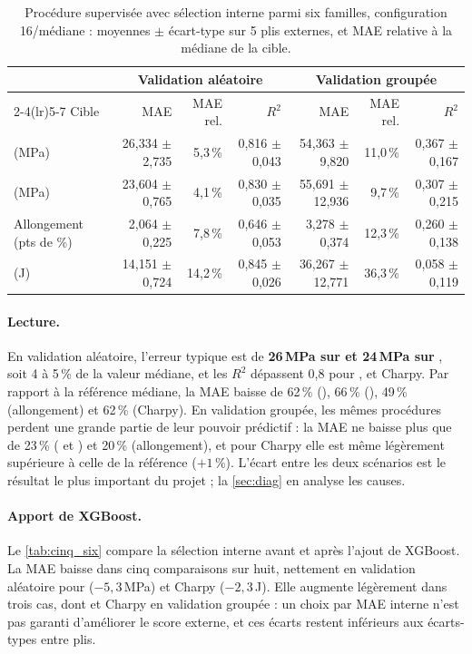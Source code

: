 \begin{table}[htbp]
\centering
\small
\caption{Procédure supervisée avec sélection interne parmi six familles,
configuration 16/médiane : moyennes $\pm$ écart-type sur 5 plis externes, et MAE
relative à la médiane de la cible.}
\label{tab:synthese}
\footnotesize
\setlength{\tabcolsep}{4pt}
\begin{tabular}{@{}l rrr rrr@{}}
\toprule
 & \multicolumn{3}{c}{Validation aléatoire} & \multicolumn{3}{c}{Validation groupée} \\
\cmidrule(lr){2-4}\cmidrule(lr){5-7}
Cible & MAE & MAE rel. & $R^2$ & MAE & MAE rel. & $R^2$ \\
\midrule
\YS{} (MPa)               & 26,334 $\pm$ 2,735 & 5,3\,\%  & 0,816 $\pm$ 0,043 & 54,363 $\pm$ 9,820  & 11,0\,\% & 0,367 $\pm$ 0,167 \\
\UTS{} (MPa)              & 23,604 $\pm$ 0,765 & 4,1\,\%  & 0,830 $\pm$ 0,035 & 55,691 $\pm$ 12,936 & 9,7\,\%  & 0,307 $\pm$ 0,215 \\
Allongement (pts de \%)   & 2,064 $\pm$ 0,225  & 7,8\,\%  & 0,646 $\pm$ 0,053 & 3,278 $\pm$ 0,374   & 12,3\,\% & 0,260 $\pm$ 0,138 \\
\charpy{} (J)             & 14,151 $\pm$ 0,724 & 14,2\,\% & 0,845 $\pm$ 0,026 & 36,267 $\pm$ 12,771 & 36,3\,\% & 0,058 $\pm$ 0,119 \\
\bottomrule
\end{tabular}
\end{table}

\paragraph{Lecture.} En validation aléatoire, l'erreur typique est de
\textbf{26\,MPa sur \YS{} et 24\,MPa sur \UTS}, soit 4 à 5\,\% de la valeur
médiane, et les $R^2$ dépassent 0,8 pour \YS, \UTS{} et Charpy. Par rapport à la
référence médiane, la MAE baisse de 62\,\% (\YS), 66\,\% (\UTS), 49\,\%
(allongement) et 62\,\% (Charpy). En validation groupée, les mêmes procédures
perdent une grande partie de leur pouvoir prédictif : la MAE ne baisse plus que
de 23\,\% (\YS{} et \UTS) et 20\,\% (allongement), et pour Charpy elle est même
légèrement supérieure à celle de la référence ($+1$\,\%). L'écart entre les deux
scénarios est le résultat le plus important du projet ; la \cref{sec:diag} en
analyse les causes.

\paragraph{Apport de XGBoost.} Le \cref{tab:cinq_six} compare la sélection
interne avant et après l'ajout de XGBoost. La MAE baisse dans cinq comparaisons
sur huit, nettement en validation aléatoire pour \YS{} ($-5{,}3$\,MPa) et Charpy
($-2{,}3$\,J). Elle augmente légèrement dans trois cas, dont \UTS{} et Charpy en
validation groupée : un choix par MAE interne n'est pas garanti d'améliorer le
score externe, et ces écarts restent inférieurs aux écarts-types entre plis.

